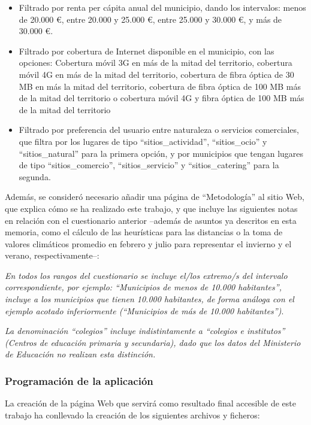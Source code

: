 \begin{itemize}
    \item Filtrado por renta per cápita anual del municipio, dando los intervalos: menos de 20.000 €, entre 20.000 y 25.000 €, entre 25.000 y 30.000 €, y más de 30.000 €.
    \item Filtrado por cobertura de Internet disponible en el municipio, con las opciones: Cobertura móvil 3G en más de la mitad del territorio, cobertura móvil 4G en más de la mitad del territorio, cobertura de fibra óptica de 30 MB en más la mitad del territorio, cobertura de fibra óptica de 100 MB más de la mitad del territorio o cobertura móvil 4G y fibra óptica de 100 MB más de la mitad del territorio
    \item Filtrado por preferencia del usuario entre naturaleza o servicios comerciales, que filtra por los lugares de tipo ``sitios\_actividad'', ``sitios\_ocio'' y ``sitios\_natural'' para la primera opción, y por municipios que tengan lugares de tipo ``sitios\_comercio'', ``sitios\_servicio'' y ``sitios\_catering'' para la segunda.
\end{itemize}

Además, se consideró necesario añadir una página de ``Metodología'' al sitio Web, que explica cómo se ha realizado este trabajo, y que incluye las siguientes notas en relación con el cuestionario anterior –además de asuntos ya descritos en esta memoria, como el cálculo de las heurísticas para las distancias o la toma de valores climáticos promedio en febrero y julio para representar el invierno y el verano, respectivamente–:

\textit{En todos los rangos del cuestionario se incluye el/los extremo/s del intervalo correspondiente, por ejemplo: ``Municipios de menos de 10.000 habitantes'', incluye a los municipios que tienen 10.000 habitantes, de forma análoga con el ejemplo acotado inferiormente (``Municipios de más de 10.000 habitantes'')}.

\textit{La denominación ``colegios'' incluye indistintamente a ``colegios e institutos'' (Centros de educación primaria y secundaria), dado que los datos del Ministerio de Educación no realizan esta distinción.}

\subsubsection{Programación de la aplicación}

La creación de la página Web que servirá como resultado final accesible de este trabajo ha conllevado la creación de los siguientes archivos y ficheros:

